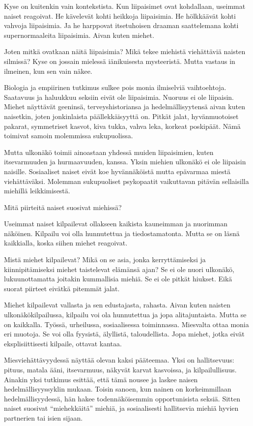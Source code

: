 Kyse on kuitenkin vain kontekstista. Kun liipaisimet ovat kohdallaan, useimmat naiset reagoivat. He kävelevät kohti heikkoja liipaisimia. He hölkkäävät kohti vahvoja liipaisimia. Ja he harppovat itsetuhoisen draaman saattelemana kohti supernormaaleita liipaisimia. Aivan kuten miehet.

Joten mitkä ovatkaan näitä liipaisimia? Mikä tekee miehistä viehättäviä naisten silmissä? Kyse on jossain mielessä iänikuisesta mysteeristä. Mutta vastaus in ilmeinen, kun sen vain näkee.

Biologia ja empiirinen tutkimus sulkee pois monia ilmiselviä vaihtoehtoja. Saatavuus ja haluukkuu seksiin eivät ole liipaisimia. Nuoruus ei ole liipaisin. Miehet näyttävät geeninsä, terveyshistoriansa ja hedelmällisyytensä aivan kuten naisetkin, joten jonkinlaista päällekkäisyyttä on. Pitkät jalat, hyvänmuotoiset pakarat, symmetriset kasvot, kiva tukka, vahva leka, korkeat poskipäät. Nämä toimivat samoin molemmissa sukupuolissa.

Mutta ulkonäkö toimii ainoastaan yhdessä muiden liipaisimien, kuten itsevarmuuden ja hurmaavuuden, kanssa. Yksin miehien ulkonäkö ei ole liipaisin naisille. Sosiaaliset naiset eivät koe hyvännäköistä mutta epävarmaa miestä viehättäväksi. Molemman sukupuoliset psykopaatit vaikuttavan pitävän sellaisilla miehillä leikkimisestä.

Mitä piirteitä naiset suosivat miehissä?

Useimmat naiset kilpailevat ollakseen kaikista kauneimman ja nuorimman näköinen. Kilpailu voi olla hunnutettua ja tiedostamatonta. Mutta se on läsnä kaikkialla, koska siihen miehet reagoivat.

Mistä miehet kilpailevat? Mikä on se asia, jonka kerryttämiseksi ja kiinnipitämiseksi miehet taistelevat elämänsä ajan? Se ei ole nuori ulkonäkö, lukuunottamatta joitakin kummallisia miehiä. Se ei ole pitkät hiukset. Eikä suorat piirteet eivätkä pitemmät jalat.

Miehet kilpailevat vallasta ja sen edustajasta, rahasta. Aivan kuten naisten ulkonäkökilpailussa, kilpailu voi ola hunnutettua ja jopa alitajuntaista. Mutta se on kaikkalla. Työssä, urheilussa, sosiaalisessa toiminnassa. Miesvalta ottaa monia eri muotoja. Se voi olla fyysistä, älyllistä, taloudellista. Jopa miehet, jotka eivät eksplisiittisesti kilpaile, ottavat kantaa.

Miesviehättävyydessä näyttää olevan kaksi pääteemaa. Yksi on hallitsevuus: pituus, matala ääni, itsevarmuus, näkyvät karvat kasvoissa, ja kilpailullisuus. Ainakin yksi tutkimus esittää, että tämä nousee ja laskee naisen hedelmällisyyssyklin mukaan. Toisin sanoen, kun nainen on korkeimmillaan hedelmällisyydessä, hän hakee todennäköisemmin opportunisista seksiä. Sitten naiset suosivat ``miehekkäitä'' miehiä, ja sosiaalisesti hallitsevia miehiä hyvien partnerien tai isien sijaan.

